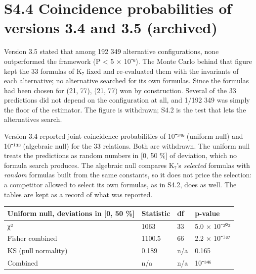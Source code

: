 \documentclass[11pt,a4paper]{article}
\begin{document}
\section{S4.4 Coincidence probabilities of versions 3.4 and 3.5 (archived)}\label{s4.4-coincidence-probabilities-of-versions-3.4-and-3.5-archived}

Version 3.5 stated that among 192 349 alternative configurations, none outperformed the framework (P \textless{} 5 × 10⁻⁶). The Monte Carlo behind that figure kept the 33 formulas of K₇ fixed and re-evaluated them with the invariants of each alternative; no alternative searched for its own formulas. Since the formulas had been chosen for (21, 77), (21, 77) won by construction. Several of the 33 predictions did not depend on the configuration at all, and 1/192 349 was simply the floor of the estimator. The figure is withdrawn; S4.2 is the test that lets the alternatives search.

Version 3.4 reported joint coincidence probabilities of 10⁻³⁴⁶ (uniform null) and 10⁻¹³³ (algebraic null) for the 33 relations. Both are withdrawn. The uniform null treats the predictions as random numbers in {[}0, 50 \%{]} of deviation, which no formula search produces. The algebraic null compares K₇'s \emph{selected} formulas with \emph{random} formulas built from the same constants, so it does not price the selection: a competitor allowed to select its own formulas, as in S4.2, does as well. The tables are kept as a record of what was reported.

\begin{longtable}[]{@{}llll@{}}
\toprule\noalign{}
Uniform null, deviations in {[}0, 50 \%{]} & Statistic & df & p-value \\
\midrule\noalign{}
\endhead
\bottomrule\noalign{}
\endlastfoot
χ² & 1063 & 33 & 5.0 × 10⁻²⁰² \\
Fisher combined & 1100.5 & 66 & 2.2 × 10⁻¹⁸⁷ \\
KS (pull normality) & 0.189 & n/a & 0.165 \\
Combined & n/a & n/a & 10⁻³⁴⁶ \\
\end{longtable}
\end{document}
